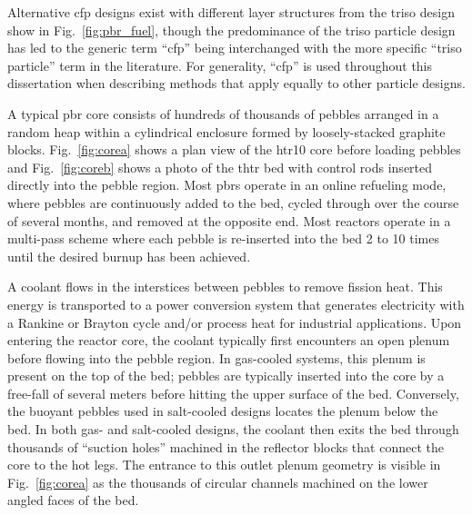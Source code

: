 Alternative \gls{cfp} designs exist with different layer structures from the \gls{triso} design show in Fig.\ \ref{fig:pbr_fuel}, though the predominance of the \gls{triso} particle design has led to the generic term ``\gls{cfp}'' being interchanged with the more specific ``\gls{triso} particle'' term in the literature. For generality, ``\gls{cfp}'' is used throughout this dissertation when describing methods that apply equally to other particle designs.

A typical \gls{pbr} core consists of hundreds of thousands of pebbles arranged in a random heap within a cylindrical enclosure formed by loosely-stacked graphite blocks. Fig.\ \ref{fig:corea} shows a plan view of the \gls{htr10} core before loading pebbles and Fig.\ \ref{fig:coreb} shows a photo of the \gls{thtr} bed with control rods inserted directly into the pebble region. Most \glspl{pbr} operate in an online refueling mode, where pebbles are continuously added to the bed, cycled through over the course of several months, and removed at the opposite end. Most reactors operate in a multi-pass scheme where each pebble is re-inserted into the bed 2 to 10 times until the desired burnup has been achieved.

A coolant flows in the interstices between pebbles to remove fission heat. This energy is transported to a power conversion system that generates electricity with a Rankine or Brayton cycle and/or process heat for industrial applications. Upon entering the reactor core, the coolant typically first encounters an open plenum before flowing into the pebble region. In gas-cooled systems, this plenum is present on the top of the bed; pebbles are typically inserted into the core by a free-fall of several meters before hitting the upper surface of the bed. Conversely, the buoyant pebbles used in salt-cooled designs locates the plenum below the bed. In both gas- and salt-cooled designs, the coolant then exits the bed through thousands of ``suction holes'' machined in the reflector blocks that connect the core to the hot legs. The entrance to this outlet plenum geometry is visible in Fig.\ \ref{fig:corea} as the thousands of circular channels machined on the lower angled faces of the bed.

